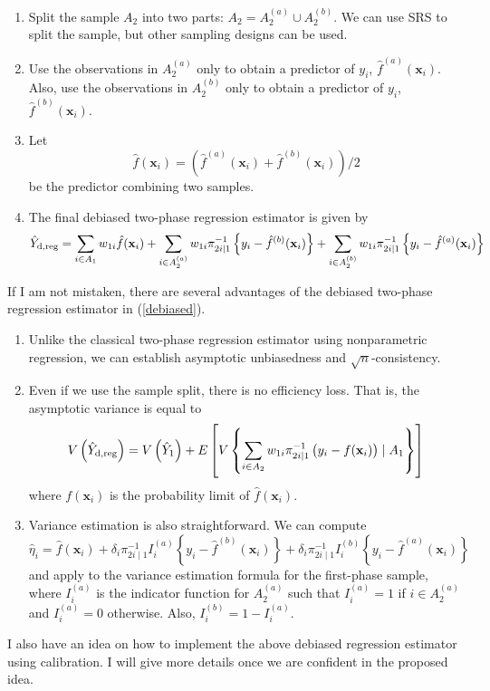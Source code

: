\documentclass[12pt]{article}
\newcommand{\bx}{\mathbf{x}}
\begin{document}
\begin{enumerate}
\item Split the sample $A_2$ into two parts: $A_2= A_2^{(a)} \cup A_2^{(b)}$.
We can use SRS to split the sample, but other sampling designs can be used. 
\item Use the observations in $A_2^{(a)}$ only to obtain a predictor of $y_i$, $\hat{f}^{(a)} (\bx_i)$. Also, use the observations in $A_2^{(b)}$ only to obtain a predictor of $y_i$, $\hat{f}^{(b)} (\bx_i)$. 
\item Let 
$$ \hat{f}(\bx_i) = \left( \hat{f}^{(a)} (\bx_i) + \hat{f}^{(b)} (\bx_i) \right)/ 2$$
be the predictor combining two samples. 
\item The final debiased two-phase regression estimator is given by 
\begin{equation}
\hat{Y}_{\rm d, reg} = \sum_{i \in A_1} w_{1i}  \hat{f}(\bx_i) +  \sum_{i \in A_2^{(a)} } w_{1i} \pi_{2i \mid 1}^{-1}   \left\{y_i - \hat{f}^{(b)} (\bx_i) \right\} +\sum_{i \in A_2^{(b)} } w_{1i} \pi_{2i \mid 1}^{-1}   \left\{y_i - \hat{f}^{(a)} (\bx_i) \right\}
\label{debiased}
\end{equation}
\end{enumerate}
 If I am not mistaken, there are several advantages of the debiased two-phase regression estimator in (\ref{debiased}). 
\begin{enumerate}
\item Unlike the classical two-phase regression estimator using nonparametric regression, we can establish asymptotic unbiasedness and  $\sqrt{n}$-consistency. 
\item Even if we use the sample split, there is no efficiency loss. That is, the asymptotic variance is equal to 
$$ V \left( \hat{Y}_{\rm d, reg} \right) = V \left( \hat{Y}_1 \right) + E\left[ V \left\{ \sum_{i \in A_2} w_{1i} \pi_{2i \mid 1}^{-1} \left( y_i - f(\bx_i) \right) \mid A_1 \right\} \right] 
$$
where $f(\bx_i)$ is the probability limit of $\hat{f}(\bx_i)$. 
\item Variance estimation is also straightforward. We can compute 
$$ \hat{\eta}_i = \hat{f}(\bx_i) +\delta_i  \pi_{2i \mid 1}^{-1} I_i^{(a)} \left\{ y_i - \hat{f}^{(b)}(\bx_i) \right\} +\delta_i \pi_{2i \mid 1}^{-1} I_i^{(b)} \left\{ y_i - \hat{f}^{(a)} (\bx_i) \right\}$$
and apply to the variance estimation formula for the first-phase sample, 
where $I_i^{(a)}$ is the indicator function for $A_2^{(a)}$ such that $I_i^{(a)} = 1$ if $i \in A_2^{(a)}$ and $I_i^{(a)}=0$ otherwise. Also, $I_i^{(b)}= 1- I_i^{(a)}$. 
\end{enumerate}


I also have an idea on how to implement the above debiased regression estimator using calibration. I will give more details once we are confident in the proposed idea. 
\end{document}
